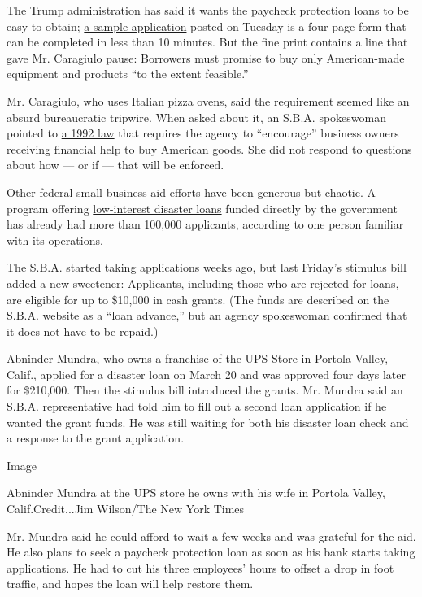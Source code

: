 The Trump administration has said it wants the paycheck protection loans
to be easy to obtain;
\href{https://www.sba.gov/sites/default/files/2020-03/Borrower\%20Paycheck\%20Protection\%20Program\%20Application_0.pdf}{a
sample application} posted on Tuesday is a four-page form that can be
completed in less than 10 minutes. But the fine print contains a line
that gave Mr. Caragiulo pause: Borrowers must promise to buy only
American-made equipment and products ``to the extent feasible.''

Mr. Caragiulo, who uses Italian pizza ovens, said the requirement seemed
like an absurd bureaucratic tripwire. When asked about it, an S.B.A.
spokeswoman pointed to
\href{https://www.congress.gov/bill/102nd-congress/house-bill/4111/text}{a
1992 law} that requires the agency to ``encourage'' business owners
receiving financial help to buy American goods. She did not respond to
questions about how --- or if --- that will be enforced.

Other federal small business aid efforts have been generous but chaotic.
A program offering
\href{https://www.nytimes.com/2020/08/03/business/small-business-loans-coronavirus.html}{low-interest
disaster loans} funded directly by the government has already had more
than 100,000 applicants, according to one person familiar with its
operations.

The S.B.A. started taking applications weeks ago, but last Friday's
stimulus bill added a new sweetener: Applicants, including those who are
rejected for loans, are eligible for up to \$10,000 in cash grants. (The
funds are described on the S.B.A. website as a ``loan advance,'' but an
agency spokeswoman confirmed that it does not have to be repaid.)

Abninder Mundra, who owns a franchise of the UPS Store in Portola
Valley, Calif., applied for a disaster loan on March 20 and was approved
four days later for \$210,000. Then the stimulus bill introduced the
grants. Mr. Mundra said an S.B.A. representative had told him to fill
out a second loan application if he wanted the grant funds. He was still
waiting for both his disaster loan check and a response to the grant
application.

Image

Abninder Mundra at the UPS store he owns with his wife in Portola
Valley, Calif.Credit...Jim Wilson/The New York Times

Mr. Mundra said he could afford to wait a few weeks and was grateful for
the aid. He also plans to seek a paycheck protection loan as soon as his
bank starts taking applications. He had to cut his three employees'
hours to offset a drop in foot traffic, and hopes the loan will help
restore them.

